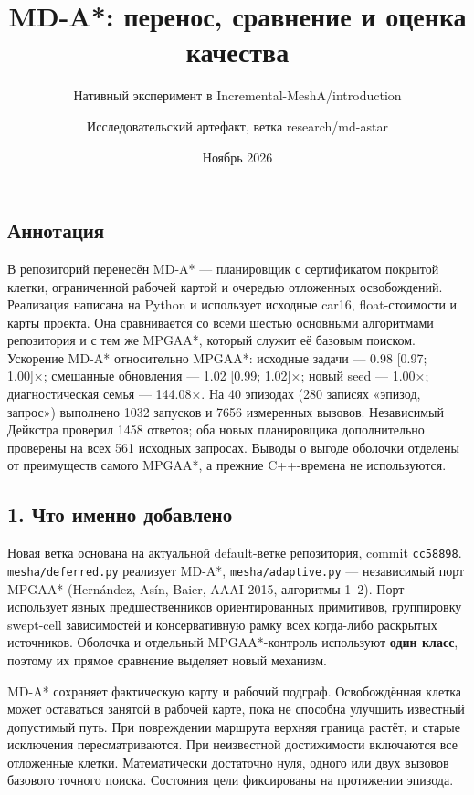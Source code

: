 \documentclass[
  10pt,
]{article}
\title{MD-A*: перенос, сравнение и оценка качества}
\subtitle{Нативный эксперимент в Incremental-MeshA/introduction}
\author{Исследовательский артефакт, ветка research/md-astar}
\date{Ноябрь 2026}
\begin{document}
\maketitle

\subsection{Аннотация}\label{ux430ux43dux43dux43eux442ux430ux446ux438ux44f}

В репозиторий перенесён MD-A* --- планировщик с сертификатом покрытой
клетки, ограниченной рабочей картой и очередью отложенных освобождений.
Реализация написана на Python и использует исходные car16,
float-стоимости и карты проекта. Она сравнивается со всеми шестью
основными алгоритмами репозитория и с тем же MPGAA*, который служит её
базовым поиском. Ускорение MD-A* относительно MPGAA*: исходные задачи
--- 0.98 {[}0.97; 1.00{]}×; смешанные обновления --- 1.02 {[}0.99;
1.02{]}×; новый seed --- 1.00×; диагностическая семья --- 144.08×. На 40
эпизодах (280 записях «эпизод, запрос») выполнено 1032 запусков и 7656
измеренных вызовов. Независимый Дейкстра проверил 1458 ответов; оба
новых планировщика дополнительно проверены на всех 561 исходных
запросах. Выводы о выгоде оболочки отделены от преимуществ самого
MPGAA*, а прежние C++-времена не используются.

\subsection{1. Что именно
добавлено}\label{ux447ux442ux43e-ux438ux43cux435ux43dux43dux43e-ux434ux43eux431ux430ux432ux43bux435ux43dux43e}

Новая ветка основана на актуальной default-ветке репозитория, commit
\texttt{cc58898}. \texttt{mesha/deferred.py} реализует MD-A*,
\texttt{mesha/adaptive.py} --- независимый порт MPGAA* (Hernández, Asín,
Baier, AAAI 2015, алгоритмы 1--2). Порт использует явных
предшественников ориентированных примитивов, группировку swept-cell
зависимостей и консервативную рамку всех когда-либо раскрытых
источников. Оболочка и отдельный MPGAA*-контроль используют \textbf{один
класс}, поэтому их прямое сравнение выделяет новый механизм.

MD-A* сохраняет фактическую карту и рабочий подграф. Освобождённая
клетка может оставаться занятой в рабочей карте, пока не способна
улучшить известный допустимый путь. При повреждении маршрута верхняя
граница растёт, и старые исключения пересматриваются. При неизвестной
достижимости включаются все отложенные клетки. Математически достаточно
нуля, одного или двух вызовов базового точного поиска. Состояния цели
фиксированы на протяжении эпизода.
\end{document}
